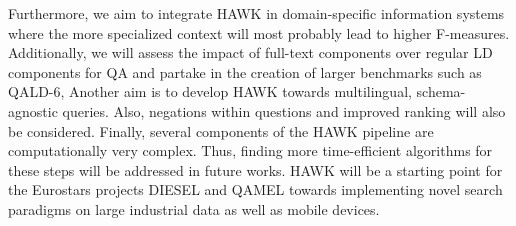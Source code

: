 Furthermore, we aim to integrate HAWK in domain-specific information systems where the more specialized context will most probably lead to higher F-measures. 
Additionally, we will assess the impact of full-text components over regular LD components for \ac{QA} and partake in the creation of larger benchmarks such as \ac{QALD}-6,
Another aim is to develop HAWK towards multilingual, schema-agnostic queries.
Also, negations within questions and improved ranking will also be considered. 
Finally, several components of the HAWK pipeline are computationally very complex. 
Thus, finding more time-efficient algorithms for these steps will be addressed in future works.
HAWK will be a starting point for the Eurostars projects DIESEL and QAMEL towards implementing novel search paradigms on large industrial data as well as mobile devices.
